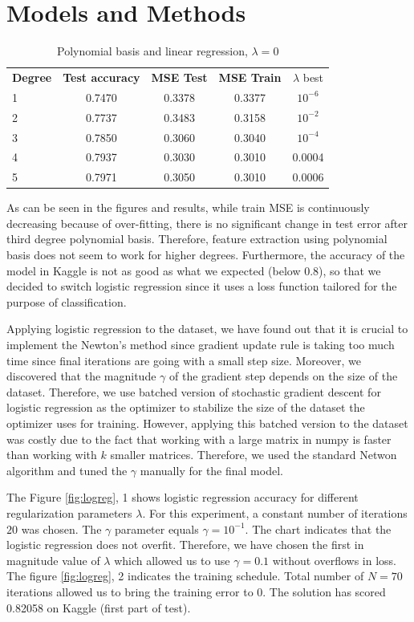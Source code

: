 \documentclass[10pt,conference,compsocconf]{IEEEtran}
\begin{document}
\section{Models and Methods}
\begin{table}[!htb]
	\caption{Polynomial basis and linear regression, $\lambda=0$}	\label{tab:degrees}
	\centering\begin{tabular}{|lcccc|}\hline
		{\bf Degree} & {\bf Test accuracy} & {\bf MSE Test} & {\bf MSE Train} & {$\lambda$ best}\\
		1 & 0.7470 & 0.3378 & 0.3377 & $10^{-6}$\\
		2 & 0.7737 & 0.3483 & 0.3158 & $10^{-2}$\\		
		3 & 0.7850 & 0.3060 & 0.3040 & $10^{-4}$\\
		4 & 0.7937 & 0.3030 & 0.3010 & 0.0004\\
		5 & 0.7971 & 0.3050 & 0.3010 & 0.0006\\\hline
	\end{tabular}
\end{table}

As can be seen in the figures and results, while train MSE is continuously decreasing because of over-fitting, there is no significant change in test error after third degree polynomial basis. Therefore, feature extraction using polynomial basis does not seem to work for higher degrees. Furthermore, the accuracy of the model in Kaggle is not as good as what we expected (below 0.8), so that we decided to switch logistic regression since it uses a loss function tailored for the purpose of classification.

Applying logistic regression to the dataset, we have found out that it is crucial to implement the Newton's method since gradient update rule is taking too much time since final iterations are going with a small step size. Moreover, we discovered that the magnitude $\gamma$ of the gradient step depends on the size of the dataset. Therefore, we use batched version of stochastic gradient descent for logistic regression as the optimizer to stabilize the size of the dataset the optimizer uses for training.
However, applying this batched version to the dataset was costly due to the fact that working with a large matrix in numpy is faster than working with $k$ smaller matrices. Therefore, we used the standard Netwon algorithm and tuned the $\gamma$ manually for the final model.

The Figure \ref{fig:logreg}, 1 shows logistic regression accuracy for different regularization parameters $\lambda$. For this experiment, a constant number of iterations $20$ was chosen. The $\gamma$ parameter equals $\gamma=10^{-1}$. The chart indicates that the logistic regression does not overfit. Therefore, we have chosen the first in magnitude value of $\lambda$ which allowed us to use $\gamma=0.1$ without overflows in loss. The figure \ref{fig:logreg}, 2 indicates the training schedule. Total number of $N=70$ iterations allowed us to bring the training error to 0. The solution has scored 0.82058 on Kaggle \cite{kaggle} (first part of test).
\end{document}
